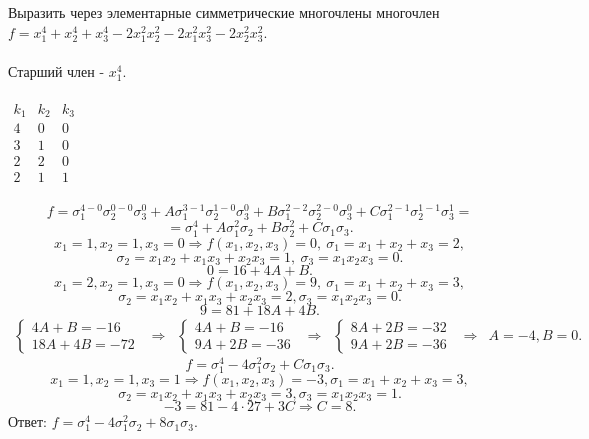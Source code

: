 \documentclass[12pt]{article}
\begin{document}
\begin{examp}
Выразить через элементарные симметрические многочлены многочлен $f = x_1^4 + x_2^4 + x_3^4 - 2x_1^2x_2^2 - 2x_1^2x_3^2 - 2x_2^2x_3^2$. \\ \\
\indent Старший член - $x_1^4$. \\ \\
$\begin{array}{c|c|c}
  k_1 & k_2 & k_3 \\ \hline
  4 & 0 & 0 \\
  3 & 1 & 0 \\
  2 & 2 & 0 \\
  2 & 1 & 1
\end{array}$ \\ \\
$$f = \sigma_1^{4-0}\sigma_2^{0-0}\sigma_3^{0} + A\sigma_1^{3-1}\sigma_2^{1-0}\sigma_3^{0} + B\sigma_1^{2-2}\sigma_2^{2-0}\sigma_3^{0} + C\sigma_1^{2-1}\sigma_2^{1-1}\sigma_3^{1} =$$
$$ = \sigma_1^{4} + A\sigma_1^{2}\sigma_2 + B\sigma_2^{2} + C\sigma_1\sigma_3.$$
$$x_1 = 1, x_2 = 1, x_3 = 0 \Rightarrow f(x_1,x_2,x_3) = 0,~\sigma_1 = x_1 + x_2 + x_3 = 2,$$
$$\sigma_2 = x_1x_2 + x_1x_3 + x_2x_3 = 1,~\sigma_3 = x_1x_2x_3 = 0.$$
$$0 = 16 + 4A + B.$$
$$x_1 = 2, x_2 = 1, x_3 = 0 \Rightarrow f(x_1,x_2,x_3) = 9,~\sigma_1 = x_1 + x_2 + x_3 = 3,$$
$$\sigma_2 = x_1x_2 + x_1x_3 + x_2x_3 = 2, \sigma_3 = x_1x_2x_3 = 0.$$
$$9 = 81 + 18A + 4B.$$
\begin{align*}
\begin{cases}
  4A + B = -16\\
  18A + 4B = -72
\end{cases}
&
\Rightarrow
&
 \begin{cases}
   4A + B = -16\\
  9A + 2B = -36
 \end{cases}
&
\Rightarrow
&
 \begin{cases}
   8A + 2B = -32\\
  9A + 2B = -36
 \end{cases}
 &
\Rightarrow
 &
  A = -4, B = 0.
\end{align*}
$$f = \sigma_1^{4} - 4\sigma_1^{2}\sigma_2 + C\sigma_1\sigma_3.$$
$$x_1 = 1, x_2 = 1, x_3 = 1 \Rightarrow f(x_1,x_2,x_3) = -3, \sigma_1 = x_1 + x_2 + x_3 = 3,$$
$$\sigma_2 = x_1x_2 + x_1x_3 + x_2x_3 = 3, \sigma_3 = x_1x_2x_3 = 1.$$
$$-3 = 81 - 4 \cdot 27 + 3C \Rightarrow C = 8.$$
Ответ: $f = \sigma_1^4 - 4\sigma_1^2\sigma_2 + 8\sigma_1\sigma_3$.
\end{examp}
\end{document}
